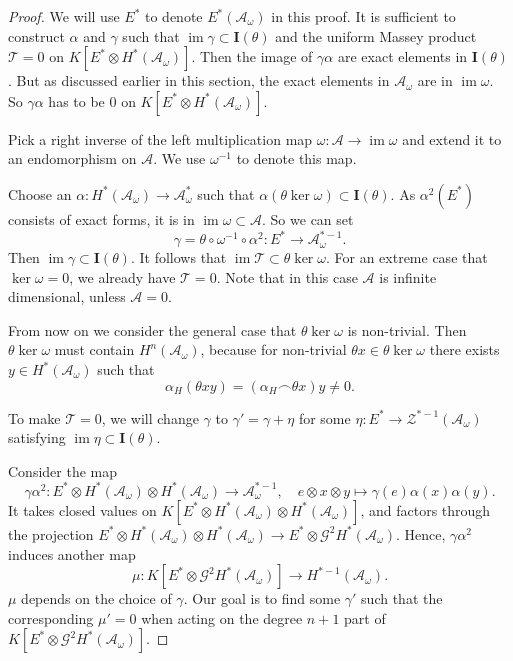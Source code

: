 \documentclass{article}
\theoremstyle{plain}
\theoremstyle{definition}
\theoremstyle{plain}
\DeclareMathOperator{\im}{im}
\numberwithin{equation}{section}
\begin{document}
\begin{proof}
We will use $E^*$ to denote $E^*(\mathcal{A}_{\omega})$ in this proof. It is sufficient to construct $\alpha$ and $\gamma$ such that $\im\gamma\subset \mathbf{I}(\theta)$ and the uniform Massey product $\mathcal{T}=0$ on $K[E^*\otimes H^*(\mathcal{A}_{\omega})]$. Then the image of $\gamma\alpha$ are exact elements in $\mathbf{I}(\theta)$. But as discussed earlier in this section, the exact elements in $\mathcal{A}_{\omega}$ are in $\im\omega$. So $\gamma\alpha$ has to be 0 on $K[E^*\otimes H^*(\mathcal{A}_{\omega})]$.

Pick a right inverse of the left multiplication map $\omega:\mathcal{A}\to\im\omega$ and extend it to an endomorphism on $\mathcal{A}$. We use $\omega^{-1}$ to denote this map.

Choose an $\alpha:H^*(\mathcal{A}_{\omega})\to \mathcal{A}_{\omega}^*$ such that $\alpha(\theta\ker\omega)\subset\mathbf{I}(\theta)$. As $\alpha^2(E^*)$ consists of exact forms, it is in $\im\omega\subset\mathcal{A}$. So we can set
$$
\gamma=\theta\circ\omega^{-1}\circ\alpha^2:E^*\to \mathcal{A}_{\omega}^{*-1}.
$$
Then $\im\gamma\subset \mathbf{I}(\theta)$. It follows that $\im\mathcal{T}\subset\theta\ker\omega$. For an extreme case that $\ker\omega=0$, we already have $\mathcal{T}=0$. Note that in this case $\mathcal{A}$ is infinite dimensional, unless $\mathcal{A}=0$.

From now on we consider the general case that $\theta\ker\omega$ is non-trivial. Then $\theta\ker\omega$ must contain $H^n(\mathcal{A}_{\omega})$, because for non-trivial $\theta x\in\theta\ker\omega$ there exists $y\in H^*(\mathcal{A}_{\omega})$ such that
$$
\alpha_H(\theta xy)=(\alpha_H\frown \theta x)y\neq 0.
$$

To make $\mathcal{T}=0$, we will change $\gamma$ to $\gamma'=\gamma+\eta$ for some $\eta:E^*\to \mathcal{Z}^{*-1}(\mathcal{A}_{\omega})$ satisfying $\im\eta\subset \mathbf{I}(\theta)$.

Consider the map
$$
\gamma\alpha^2:E^*\otimes H^*(\mathcal{A}_{\omega}) \otimes H^*(\mathcal{A}_{\omega})\to \mathcal{A}_{\omega}^{*-1},\quad e\otimes x\otimes y\mapsto \gamma(e)\alpha(x)\alpha(y).
$$
It takes closed values on $K[E^*\otimes H^*(\mathcal{A}_{\omega}) \otimes H^*(\mathcal{A}_{\omega})]$, and factors through the projection $E^*\otimes H^*(\mathcal{A}_{\omega}) \otimes H^*(\mathcal{A}_{\omega})\to E^*\otimes \mathcal{G}^2H^*(\mathcal{A}_{\omega})$. Hence, $\gamma\alpha^2$ induces another map
$$
\mu:K[E^*\otimes \mathcal{G}^2H^*(\mathcal{A}_{\omega})]\to H^{*-1}(\mathcal{A}_{\omega}).
$$
$\mu$ depends on the choice of $\gamma$. Our goal is to find some $\gamma'$ such that the corresponding $\mu'=0$ when acting on the degree $n+1$ part of $K[E^*\otimes \mathcal{G}^2H^*(\mathcal{A}_{\omega})]$.


\end{proof}
\end{document}
